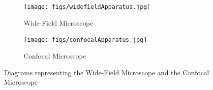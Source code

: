 \begin{figure}
    \centering
    \begin{subfigure}[t]{0.3\textwidth}
        \texttt{[image: figs/widefieldApparatus.jpg]}
        \caption{Wide-Field Microscope}
        \label{subfig:WFM}
    \end{subfigure}
    \hfill
    \begin{subfigure}[t]{0.69\textwidth}
        \texttt{[image: figs/confocalApparatus.jpg]}
        \caption{Confocal Microscope}
        \label{subfig:CM}
    \end{subfigure}
    \caption{Diagrams representing the Wide-Field Microscope and the Confocal Microscope \cite{Sanderson-2014}}
    \label{fig:microscope_diagrams}
\end{figure}


